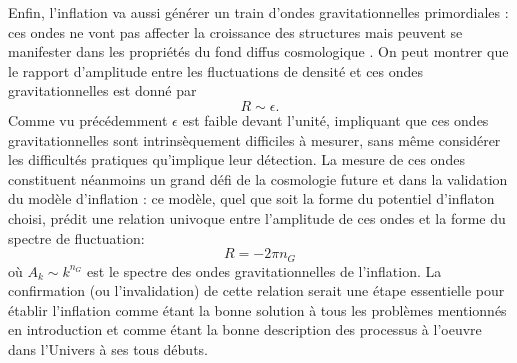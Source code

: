 Enfin, l'inflation va aussi générer un train d'ondes gravitationnelles primordiales : ces ondes ne vont pas affecter la croissance des structures mais peuvent se manifester dans les propriétés du fond diffus cosmologique .
On peut montrer que le rapport d'amplitude entre les fluctuations de densité et ces ondes gravitationnelles est donné par
\begin{equation}
R\sim \epsilon.
\end{equation}
Comme vu précédemment $\epsilon$ est faible devant l'unité, impliquant que ces ondes gravitationnelles sont intrinsèquement difficiles à mesurer, sans même considérer les difficultés pratiques qu'implique leur détection. La mesure de ces ondes constituent néanmoins un grand défi de la cosmologie future et dans la validation du modèle d'inflation : ce modèle, quel que soit la forme du potentiel d'inflaton choisi, prédit une relation univoque entre l'amplitude de ces ondes et la forme du spectre de fluctuation:
\begin{equation}
R=-2\pi n_G
\end{equation}
où $A_k\sim k^{n_G}$ est le spectre des ondes gravitationnelles de l'inflation. La confirmation (ou l'invalidation) de cette relation serait une étape essentielle pour établir l'inflation comme étant la bonne solution à tous les problèmes mentionnés en introduction et comme étant la bonne description des processus à l'oeuvre dans l'Univers à ses tous débuts. 